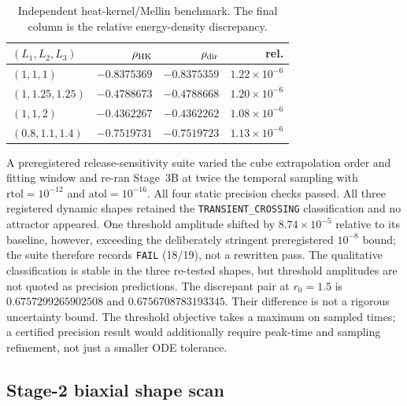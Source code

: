 \documentclass[aps,prd,reprint,superscriptaddress,nofootinbib,floatfix,showkeys]{revtex4-2}
\begin{document}
\begin{table}[tbp]
\caption{Independent heat-kernel/Mellin benchmark.  The final column is the
relative energy-density discrepancy.}
\label{tab:hk}
\scriptsize
\begin{ruledtabular}
\begin{tabular}{lrrr}
\((L_1,L_2,L_3)\) & \(\rho_{\rm HK}\) & \(\rho_{\rm dir}\) & rel. \\
\hline
\((1,1,1)\) & \(-0.8375369\) & \(-0.8375359\) & \(1.22\!\times\!10^{-6}\) \\
\((1,1.25,1.25)\) & \(-0.4788673\) & \(-0.4788668\) & \(1.20\!\times\!10^{-6}\) \\
\((1,1,2)\) & \(-0.4362267\) & \(-0.4362262\) & \(1.08\!\times\!10^{-6}\) \\
\((0.8,1.1,1.4)\) & \(-0.7519731\) & \(-0.7519723\) & \(1.13\!\times\!10^{-6}\) \\
\end{tabular}
\end{ruledtabular}
\end{table}

A preregistered release-sensitivity suite varied the cube extrapolation order
and fitting window and re-ran Stage~3B at twice the temporal sampling with
\(\mathrm{rtol}=10^{-12}\) and \(\mathrm{atol}=10^{-16}\).  All four static
precision checks passed.  All three registered dynamic shapes retained the
\texttt{TRANSIENT\_CROSSING} classification and no attractor appeared.  One
threshold amplitude shifted by \(8.74\times10^{-5}\) relative to its baseline, however,
exceeding the deliberately stringent preregistered \(10^{-8}\) bound; the
suite therefore records \texttt{FAIL} (18/19), not a rewritten pass.  The
qualitative classification is stable in the three re-tested shapes, but
threshold amplitudes are not quoted as precision predictions. The discrepant
pair at \(r_0=1.5\) is \(0.6757299265902508\) and
\(0.6756708783193345\). Their difference is not a rigorous uncertainty bound.
The threshold objective takes a maximum on sampled times; a certified
precision result would additionally require peak-time and sampling
refinement, not just a smaller ODE tolerance.

\subsection{Stage-2 biaxial shape scan}
\end{document}
